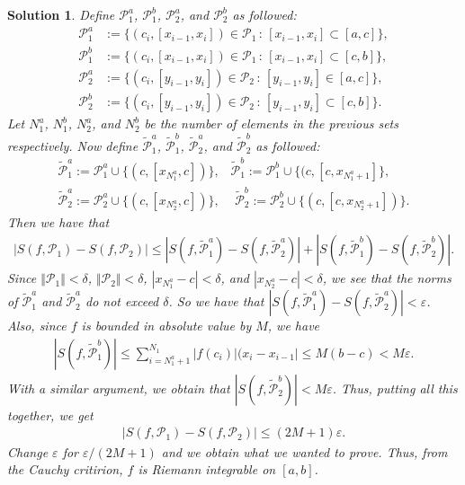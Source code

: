 \documentclass[12pt]{article}
\newcommand{\cP}{\mathcal{P}}
\theoremstyle{plain}
\theoremstyle{plain}
\newtheorem*{sol}{\textbf{Solution}}}
\theoremstyle{plain}
\theoremstyle{plain}
\begin{document}
\begin{sol}
Define $\cP_1^a$, $\cP_1^b$, $\cP_2^a$, and $\cP_2^b$ as followed:
	\begin{align*}
	\cP_1^a &:= \{ (c_i , [x_{i - 1} , x_i ]) \in \cP_1 \, : \, [x_{i-1}, x_i] \subset [a, c] \}, \\
	\cP_1^b & := \{ (c_i , [x_{i - 1}, x_i]) \in \cP_1 \, : \, [x_{i-1}, x_i] \subset [c, b] \},\\
	\cP_2^a & := \{ (c_i , [y_{i - 1}, y_i]) \in \cP_2 \, : \, [y_{i-1}, y_i] \in [a, c] \} , \\
	\cP_2^b & := \{ (c_i , [y_{i - 1}, y_i]) \in \cP_2 \, : \, [y_{i-1} , y_i] \subset [c, b] \} .
	\end{align*}
Let $N_1^a$, $N_1^b$, $N_2^a$, and $N_2^b$ be the number of elements in the previous sets respectively. Now define $\tilde{\cP}_1^a$, $\tilde{\cP}_1^b$, $\tilde{\cP}_2^a$, and $\tilde{\cP}_2^b$ as followed:
	\begin{align*}
	\tilde{\cP}_1^a := \cP_1^a \cup \{(c , [x_{N_1^a} , c])\} \text{,} \quad	\tilde{\cP}_1^b := \cP_1^b \cup \{ (c, [c, x_{N_1^a + 1}] \}, \\
	\tilde{\cP}_2^a := \cP_2^a \cup \{ (c , [x_{N_2^a} , c] ) \} \text{, } \quad \tilde{\cP}_2^b := \cP_2^b \cup \{ (c , [c, x_{N_2^a + 1}]) \} .
	\end{align*}
Then we have that
	\begin{align*}
	|S (f, \cP_1 ) - S (f , \cP_2 ) | \leq |S (f, \tilde{\cP}_1^a) - S (f , \tilde{\cP}_2^a ) | + |S (f, \tilde{\cP}_1^b) - S (f, \tilde{\cP}_2^b) | .
	\end{align*}
Since $\Vert \cP_1 \Vert < \delta$, $\Vert \cP_2 \Vert < \delta$, $|x_{N_1^a} - c| < \delta$, and $|x_{N_2^a} - c| < \delta$, we see that the norms of $\tilde{\cP}_1^a$ and $\tilde{\cP}_2^a$ do not exceed $\delta$. So we have that $|S (f, \tilde{\cP}_1^a) - S (f , \tilde{\cP}_2^a ) | < \varepsilon$. Also, since $f$ is bounded in absolute value by $M$, we have
	\begin{align*}
	|S (f, \tilde{\cP}_1^b)| \leq \sum_{i = N_1^a + 1}^{N_1} |f(c_i)| (x_i - x_{i-1}| \leq M (b - c) < M \varepsilon .
	\end{align*}
With a similar argument, we obtain that $|S (f, \tilde{\cP}_2^b)| < M \varepsilon$. Thus, putting all this together, we get
	\begin{align*}
	|S (f, \cP_1 ) - S (f, \cP_2)| \leq (2M + 1) \varepsilon .
	\end{align*}
Change $\varepsilon$ for $\varepsilon/(2M + 1)$ and we obtain what we wanted to prove. Thus, from the Cauchy critirion, $f$ is Riemann integrable on $[a, b]$.
\end{sol}
\end{document}
